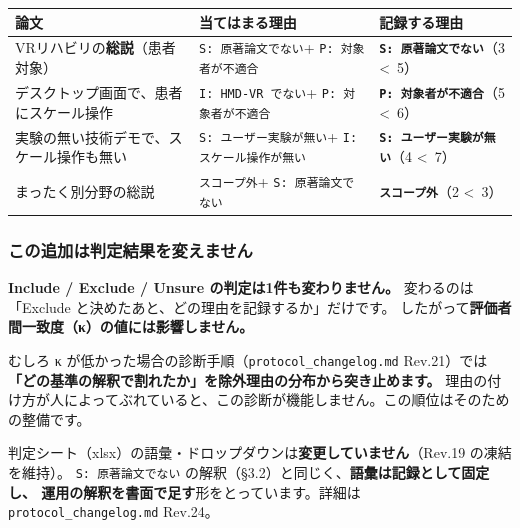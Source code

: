\documentclass[a4paper]{ltjsarticle}
\newcommand{\addbox}[1]{%
  \par\medskip
  \noindent\colorbox{newc}{%
    \begin{minipage}{\dimexpr\linewidth-2\fboxsep\relax}
      \vspace{4pt}#1\vspace{4pt}
    \end{minipage}}%
  \par\medskip}
\newcommand{\rsn}[1]{\texttt{\small #1}}
\begin{document}
\begin{center}
\begin{tabularx}{\linewidth}{X L{14em} L{12.5em}}
\toprule
論文 & 当てはまる理由 & \textbf{記録する理由} \\
\midrule
VRリハビリの\textbf{総説}（患者対象）
& \rsn{S: 原著論文でない}\newline + \rsn{P: 対象者が不適合}
& \textbf{\rsn{S: 原著論文でない}}\newline （3 \textless\ 5） \\
\addlinespace
デスクトップ画面で、患者にスケール操作
& \rsn{I: HMD-VR でない}\newline + \rsn{P: 対象者が不適合}
& \textbf{\rsn{P: 対象者が不適合}}\newline （5 \textless\ 6） \\
\addlinespace
実験の無い技術デモで、スケール操作も無い
& \rsn{S: ユーザー実験が無い}\newline + \rsn{I: スケール操作が無い}
& \textbf{\rsn{S: ユーザー実験が無い}}\newline （4 \textless\ 7） \\
\addlinespace
まったく別分野の総説
& \rsn{スコープ外}\newline + \rsn{S: 原著論文でない}
& \textbf{\rsn{スコープ外}}\newline （2 \textless\ 3） \\
\bottomrule
\end{tabularx}
\end{center}

\subsubsection*{この追加は判定結果を変えません}

\addbox{%
\textbf{Include / Exclude / Unsure の判定は1件も変わりません。}
変わるのは「Exclude と決めたあと、どの理由を記録するか」だけです。
したがって\textbf{評価者間一致度（κ）の値には影響しません。}}

\noindent
むしろ κ が低かった場合の診断手順（\texttt{protocol\_changelog.md} Rev.21）では
\textbf{「どの基準の解釈で割れたか」を除外理由の分布から突き止めます。}
理由の付け方が人によってぶれていると、この診断が機能しません。この順位はそのための整備です。

\medskip
\noindent
判定シート（xlsx）の語彙・ドロップダウンは\textbf{変更していません}（Rev.19 の凍結を維持）。
\rsn{S: 原著論文でない} の解釈（§3.2）と同じく、\textbf{語彙は記録として固定し、
運用の解釈を書面で足す}形をとっています。詳細は \texttt{protocol\_changelog.md} Rev.24。
\end{document}
